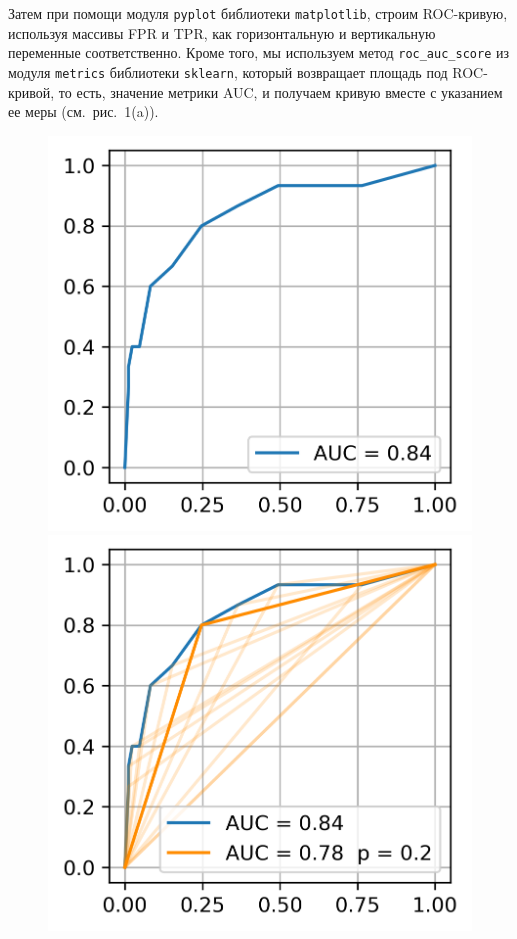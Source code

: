 \medskip

Затем при помощи модуля \texttt{pyplot} библиотеки \texttt{matplotlib}, строим ROC-кривую, используя массивы FPR и TPR, как горизонтальную и вертикальную переменные соответственно. Кроме того, мы используем метод \texttt{roc\_auc\_score} из модуля \texttt{metrics} библиотеки \texttt{sklearn}, который возвращает площадь под ROC-кривой, то есть, значение метрики AUC, и получаем кривую вместе с указанием ее меры (см. рис.~1(a)).


\begin{figure}[!htb]
	\centering
	\begin{minipage}{0.32\textwidth}
		\includegraphics[width=\linewidth]{pictures/ROC-кривая}
	\end{minipage}
	\hspace{0.1\textwidth}
	\begin{minipage}{0.32\textwidth}
		\includegraphics[width=\linewidth]{pictures/Прогон порогов бинаризации}


\end{minipage}
\end{figure}
